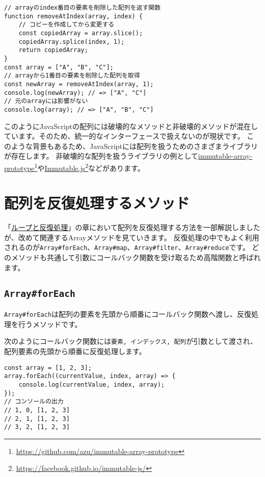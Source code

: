 \begin{lstlisting}
// arrayのindex番目の要素を削除した配列を返す関数
function removeAtIndex(array, index) {
    // コピーを作成してから変更する
    const copiedArray = array.slice();
    copiedArray.splice(index, 1);
    return copiedArray;
}
const array = ["A", "B", "C"];
// arrayから1番目の要素を削除した配列を取得
const newArray = removeAtIndex(array, 1);
console.log(newArray); // => ["A", "C"]
// 元のarrayには影響がない
console.log(array); // => ["A", "B", "C"]
\end{lstlisting}

このようにJavaScriptの配列には破壊的なメソッドと非破壊的メソッドが混在しています。そのため、統一的なインターフェースで扱えないのが現状です。
このような背景もあるため、JavaScriptには配列を扱うためのさまざまライブラリが存在します。
非破壊的な配列を扱うライブラリの例として\href{https://github.com/azu/immutable-array-prototype}{immutable-array-prototype}\footnote{\url{https://github.com/azu/immutable-array-prototype}}や\href{https://facebook.github.io/immutable-js/}{Immutable.js}\footnote{\url{https://facebook.github.io/immutable-js/}}などがあります。

\hypertarget{array-iterate}{%
\section{配列を反復処理するメソッド}\label{array-iterate}}

「\hyperlink{loop-and-iteration}{ループと反復処理}」の章において配列を反復処理する方法を一部解説しましたが、改めて関連するArrayメソッドを見ていきます。
反復処理の中でもよく利用されるのが\texttt{Array\#forEach}、\texttt{Array\#map}、\texttt{Array\#filter}、\texttt{Array\#reduce}です。
どのメソッドも共通して引数にコールバック関数を受け取るため高階関数と呼ばれます。

\hypertarget{array-foreach}{%
\subsection{\texorpdfstring{\texttt{Array\#forEach}}{Array\#forEach}}\label{array-foreach}}

\texttt{Array\#forEach}は配列の要素を先頭から順番にコールバック関数へ渡し、反復処理を行うメソッドです。

次のようにコールバック関数には\texttt{要素, インデックス, 配列}が引数として渡され、配列要素の先頭から順番に反復処理します。

\begin{lstlisting}
const array = [1, 2, 3];
array.forEach((currentValue, index, array) => {
    console.log(currentValue, index, array);
});
// コンソールの出力
// 1, 0, [1, 2, 3]
// 2, 1, [1, 2, 3]
// 3, 2, [1, 2, 3]
\end{lstlisting}

